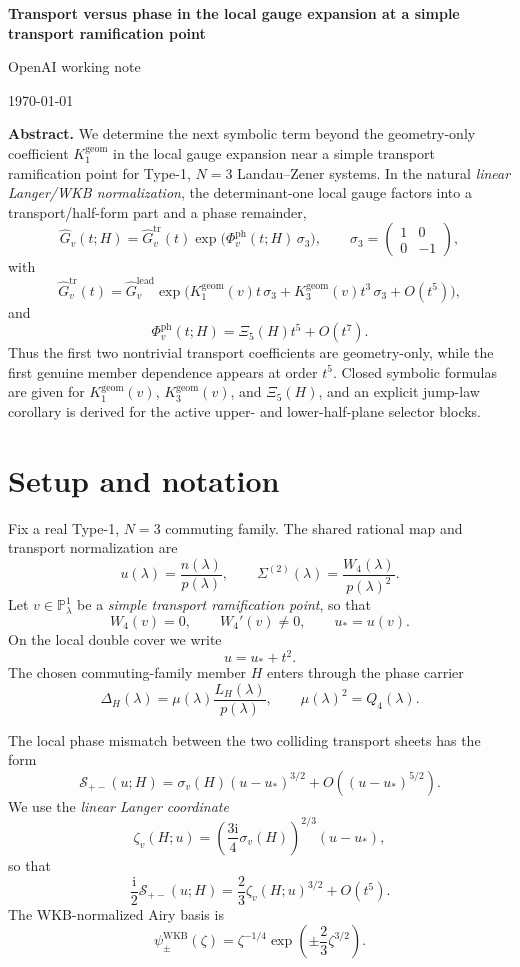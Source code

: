 \documentclass[11pt]{article}
\newcommand{\PP}{\mathbb P}
\newcommand{\ii}{\mathrm i}
\newcommand{\pairgap}{\Delta}
\newcommand{\leadG}{\widehat G_v^{\mathrm{lead}}}
\newcommand{\Kone}{K_1^{\mathrm{geom}}(v)}
\newcommand{\Kthree}{K_3^{\mathrm{geom}}(v)}
\begin{document}
\begin{center}
{\Large\bfseries Transport versus phase in the local gauge expansion at a simple transport ramification point}\par
\vspace{0.35em}
{\large OpenAI working note}\par
\vspace{0.35em}
{\normalsize \today}
\end{center}

\textbf{Abstract.}
We determine the next symbolic term beyond the geometry-only coefficient $K_1^{\mathrm{geom}}$ in the local gauge expansion near a simple transport ramification point for Type-1, $N=3$ Landau--Zener systems.  In the natural \emph{linear Langer/WKB normalization}, the determinant-one local gauge factors into a transport/half-form part and a phase remainder,
\[
\widehat G_v(t;H)=\widehat G_v^{\mathrm{tr}}(t)\exp\!\bigl(\Phi_v^{\mathrm{ph}}(t;H)\,\sigma_3\bigr),
\qquad \sigma_3=\begin{pmatrix}1&0\\0&-1\end{pmatrix},
\]
with
\[
\widehat G_v^{\mathrm{tr}}(t)=\leadG\exp\!\bigl(\Kone t\,\sigma_3+\Kthree t^3\,\sigma_3+O(t^5)\bigr),
\]
and
\[
\Phi_v^{\mathrm{ph}}(t;H)=\Xi_5(H)t^5+O(t^7).
\]
Thus the first two nontrivial transport coefficients are geometry-only, while the first genuine member dependence appears at order $t^5$. Closed symbolic formulas are given for $\Kone$, $\Kthree$, and $\Xi_5(H)$, and an explicit jump-law corollary is derived for the active upper- and lower-half-plane selector blocks.

\section{Setup and notation}

Fix a real Type-1, $N=3$ commuting family.  The shared rational map and transport normalization are
\[
 u(\lambda)=\frac{n(\lambda)}{p(\lambda)},
 \qquad
 \Sigma^{(2)}(\lambda)=\frac{W_4(\lambda)}{p(\lambda)^2}.
\]
Let $v\in \PP^1_\lambda$ be a \emph{simple transport ramification point}, so that
\[
 W_4(v)=0,
 \qquad
 W_4'(v)\neq 0,
 \qquad
 u_*=u(v).
\]
On the local double cover we write
\[
 u=u_*+t^2.
\]
The chosen commuting-family member $H$ enters through the phase carrier
\[
 \pairgap_H(\lambda)=\mu(\lambda)\frac{L_H(\lambda)}{p(\lambda)},
 \qquad \mu(\lambda)^2=Q_4(\lambda).
\]

The local phase mismatch between the two colliding transport sheets has the form
\[
 \mathcal S_{+-}(u;H)=\sigma_v(H)(u-u_*)^{3/2}+O((u-u_*)^{5/2}).
\]
We use the \emph{linear Langer coordinate}
\begin{equation}
\label{eq:zeta}
 \zeta_v(H;u)=\left(\frac{3\ii}{4}\sigma_v(H)\right)^{2/3}(u-u_*),
\end{equation}
so that
\[
 \frac{\ii}{2}\mathcal S_{+-}(u;H)=\frac{2}{3}\zeta_v(H;u)^{3/2}+O(t^5).
\]
The WKB-normalized Airy basis is
\[
 \psi_\pm^{\mathrm{WKB}}(\zeta)=\zeta^{-1/4}\exp\!\left(\pm \frac{2}{3}\zeta^{3/2}\right).
\]
\end{document}

